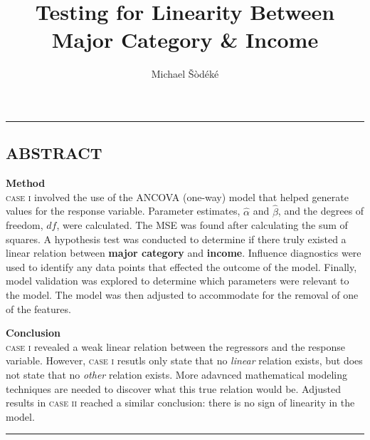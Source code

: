 \documentclass[10pt, twoside, openleft]{article}
\title{Testing for Linearity Between Major Category \& Income}
\author{Michael Šòdéké}
\date{\vspace{-14ex}}
\newcommand{\alphahat}{\hat{\alpha}} %
\newcommand{\betahat}{\hat{\beta}} %
\begin{document}
\maketitle

\noindent\rule[-2.0\baselineskip]{\linewidth}{0.2pt}
\vspace{-3ex}
\begin{center}
\section{ABSTRACT}
\vspace{-3ex}
\end{center}

\noindent
\textbf{Method} \\
\textsc{case i} involved the use of the ANCOVA (one-way) model that helped
generate values for the response variable. Parameter estimates,
$\alphahat$ and $\betahat$, and the degrees of freedom, $df$, were calculated.
The MSE was found after calculating the sum of squares. A hypothesis test was
conducted to determine if there truly existed a linear relation between
\textbf{major category} and \textbf{income}. Influence diagnostics were used to
identify any data points that effected the outcome of the model. Finally, model
validation was explored to determine which parameters were relevant to the model.
The model was then adjusted to accommodate for the removal of one of the features. 
\smallskip

\noindent
\textbf{Conclusion} \\
\textsc{case i} revealed a weak linear relation between the regressors and
the response variable. However, \textsc{case i} resutls only
state that no \emph{linear} relation exists, but does not state that
no \emph{other} relation exists. More adavnced mathematical modeling techniques
are needed to discover what this true relation would be. Adjusted results in
\textsc{case ii} reached a similar conclusion: there is no sign of linearity in
the model.
\smallskip

\noindent\rule[0.5ex]{\linewidth}{0.2pt}
\bigskip
\bigskip
\end{document}
